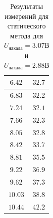 \documentclass[a4paper, 12pt]{article}
\begin{document}
\begin{table}[!ht]
\begin{tabular}{|c|c|}
        $6.42$ & $32.7$\\ \hline
        $6.83$ & $32.2$\\ \hline
        $7.24$ & $32.1$\\ \hline
        $7.66$ & $32.3$\\ \hline
        $8.05$ & $32.8$\\ \hline
        $8.42$ & $33.7$\\ \hline
        $8.81$ & $35.5$\\ \hline
        $9.22$ & $36.9$\\ \hline
        $9.62$ & $37.3$\\ \hline
        $10.03$ & $38.8$\\ \hline
        $10.44$ & $42.2$\\ \hline

    \end{tabular}
    \caption{Результаты измерений для статического метода для $U_{накала} = 3.07 В$ и $U_{накала} = 2.88 В$}
    \label{}
\end{table}
\end{document}
